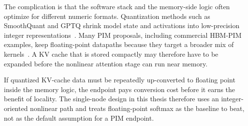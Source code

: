 \begin{sloppypar}
The complication is that the software stack and the memory-side logic often optimize for different numeric formats. Quantization methods such as SmoothQuant and GPTQ shrink model state and activations into low-precision integer representations~\cite{llm_smoothquant, gptq}. Many PIM proposals, including commercial HBM-PIM examples, keep floating-point datapaths because they target a broader mix of kernels~\cite{samsung_pim}. A KV cache that is stored compactly may therefore have to be expanded before the nonlinear attention stage can run near memory.
\end{sloppypar}

If quantized KV-cache data must be repeatedly up-converted to floating point inside the memory logic, the endpoint pays conversion cost before it earns the benefit of locality. The single-node design in this thesis therefore uses an integer-oriented nonlinear path and treats floating-point softmax as the baseline to beat, not as the default assumption for a PIM endpoint.
